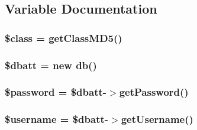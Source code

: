 \subsection{Variable Documentation}
\hypertarget{takeattend_8php_a252ba022809910ea710a068fc1bab657}{
\subsubsection[{\$class}]{\setlength{\rightskip}{0pt plus 5cm}\$class = {\bf get\-Class\-M\-D5}()}}\label{takeattend_8php_a252ba022809910ea710a068fc1bab657}
\hypertarget{takeattend_8php_a91a28d35770d3a47412dce6c8059f374}{
\subsubsection[{\$dbatt}]{\setlength{\rightskip}{0pt plus 5cm}\$dbatt = new {\bf db}()}}\label{takeattend_8php_a91a28d35770d3a47412dce6c8059f374}
\hypertarget{takeattend_8php_a607686ef9f99ea7c42f4f3dd3dbb2b0d}{
\subsubsection[{\$password}]{\setlength{\rightskip}{0pt plus 5cm}\$password = \$dbatt-\/$>$get\-Password()}}\label{takeattend_8php_a607686ef9f99ea7c42f4f3dd3dbb2b0d}
\hypertarget{takeattend_8php_a0eb82aa5f81cf845de4b36cd653c42cf}{
\subsubsection[{\$username}]{\setlength{\rightskip}{0pt plus 5cm}\$username = \$dbatt-\/$>$get\-Username()}}\label{takeattend_8php_a0eb82aa5f81cf845de4b36cd653c42cf}
